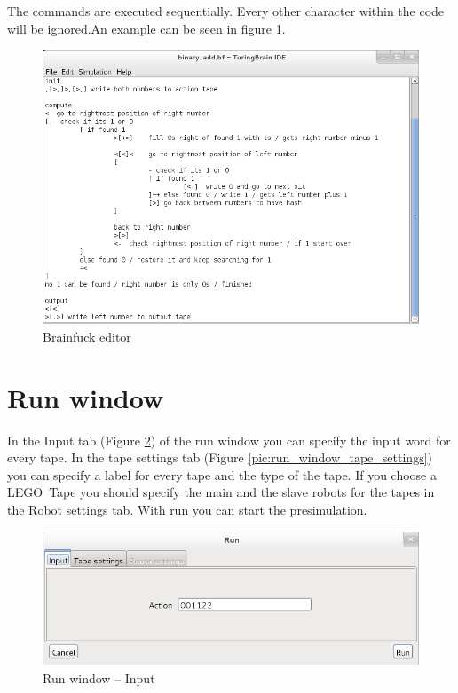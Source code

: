\documentclass[%
  a4paper,%
  11pt,%
  blue,%
  hyperref	%
  ]{tubsartcl}
\begin{document}
\bigskip
The commands are executed sequentially. Every other character within the code will be ignored.An example can be seen in figure \ref{pic:brainfuck_editor}.

\begin{figure}[!htb]
\begin{center}
\includegraphics[scale=0.5]{graphics_gui/brainfuck_editor.png}
\end{center}
\caption{Brainfuck editor}
\label{pic:brainfuck_editor}
\end{figure}

\clearpage

\section{Run window}
In the Input tab (Figure \ref{pic:run_window_input}) of the run window you can specify the input word for every tape. In the tape settings tab (Figure \ref{pic:run_window_tape_settings}) you can specify a label for every tape and the type of the tape. If you choose a LEGO\textregistered\, Tape you should specify the main and the slave robots for the tapes in the Robot settings tab. With run you can start the presimulation.
\begin{figure}[!htb]
\begin{center}
\includegraphics[scale=0.5]{graphics_gui/run_window_input.png}
\end{center}
\caption{Run window -- Input}
\label{pic:run_window_input}
\end{figure}
\end{document}
